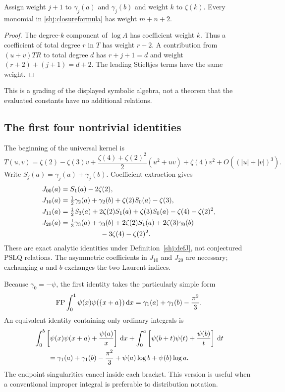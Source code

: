 \begin{corollary}\label{shj:weight}
Assign weight $j+1$ to $\gamma_j(a)$ and $\gamma_j(b)$ and weight $k$ to $\zeta(k)$. Every monomial in \eqref{shj:closureformula} has weight $m+n+2$.
\end{corollary}
\begin{proof}
The degree-$k$ component of $\log A$ has coefficient weight $k$. Thus a coefficient of total degree $r$ in $T$ has weight $r+2$. A contribution from $(u+v)TR$ to total degree $d$ has $r+j+1=d$ and weight $(r+2)+(j+1)=d+2$. The leading Stieltjes terms have the same weight.
\end{proof}
This is a grading of the displayed symbolic algebra, not a theorem that the evaluated constants have no additional relations.

\subsection{The first four nontrivial identities}
The beginning of the universal kernel is
\begin{equation}\label{shj:Tstart}
T(u,v)=\zeta(2)-\zeta(3)v
+\frac{\zeta(4)+\zeta(2)^2}{2}(u^2+uv)
+\zeta(4)v^2+O((|u|+|v|)^3).
\end{equation}
Write $S_j(a)=\gamma_j(a)+\gamma_j(b)$. Coefficient extraction gives
\begin{align}
J_{00}(a)&=S_1(a)-2\zeta(2),\label{shj:J00}\\
J_{10}(a)&=\tfrac12\gamma_2(a)+\gamma_2(b)
+\zeta(2)S_0(a)-\zeta(3),\label{shj:J10}\\
J_{11}(a)&=\tfrac12 S_3(a)+2\zeta(2)S_1(a)+\zeta(3)S_0(a)
-\zeta(4)-\zeta(2)^2,\label{shj:J11}\\
J_{20}(a)&=\tfrac13\gamma_3(a)+\gamma_3(b)+2\zeta(2)S_1(a)
+2\zeta(3)\gamma_0(b)\notag\\
&\hspace{2cm}-3\zeta(4)-\zeta(2)^2.\label{shj:J20}
\end{align}
These are exact analytic identities under Definition~\ref{shj:defJ}, not conjectured PSLQ relations. The asymmetric coefficients in $J_{10}$ and $J_{20}$ are necessary; exchanging $a$ and $b$ exchanges the two Laurent indices.

Because $\gamma_0=-\psi$, the first identity takes the particularly simple form
\begin{equation}\label{shj:psipsi}
\operatorname{FP}\int_0^1\psi(x)\psi(\{x+a\})\,\mathrm d x
=\gamma_1(a)+\gamma_1(b)-\frac{\pi^2}{3}.
\end{equation}
An equivalent identity containing only ordinary integrals is
\begin{align}
&\int_0^b\left[\psi(x)\psi(x+a)+\frac{\psi(a)}x\right]\,\mathrm d x
+\int_0^a\left[\psi(b+t)\psi(t)+\frac{\psi(b)}t\right]\,\mathrm d t\notag\\
&\qquad=\gamma_1(a)+\gamma_1(b)-\frac{\pi^2}{3}
+\psi(a)\log b+\psi(b)\log a.
\label{shj:psipsireg}
\end{align}
The endpoint singularities cancel inside each bracket. This version is useful when a conventional improper integral is preferable to distribution notation.

